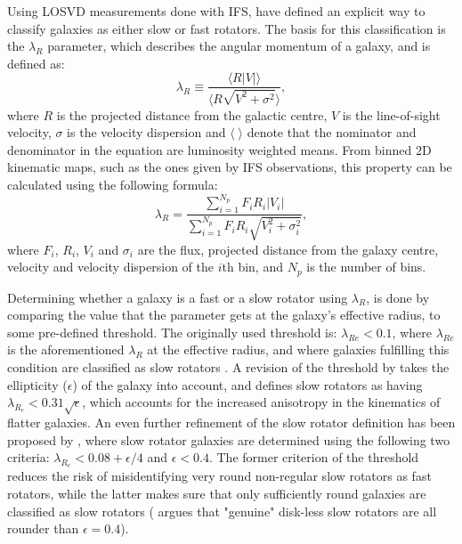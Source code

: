\documentclass[english, twoside]{HYgradu}
\begin{document}
Using LOSVD measurements done with IFS, \cite{Emsellem2007} have defined an explicit way to classify galaxies as either slow or fast rotators. The basis for this classification is the $\lambda_R$ parameter, which describes the angular momentum of a galaxy, and is defined as:  
\begin{equation}
\lambda_R \equiv \frac{\langle R |V| \rangle}{\langle R \sqrt{V^2 + \sigma^2} \rangle}, \label{eq:general_lambdar}
\end{equation}
where $R$ is the projected distance from the galactic centre, $V$ is the line-of-sight velocity, $\sigma$ is the velocity dispersion and $\langle \; \rangle$ denote that the nominator and denominator in the equation are luminosity weighted means. From binned 2D kinematic maps, such as the ones given by IFS observations, this property can be calculated using the following formula:
\begin{equation}
\lambda_R = \frac{\sum^{N_p}_{i=1} F_i R_i |V_i|}{\sum^{N_p}_{i=1} F_i R_i \sqrt{V_i^2 + \sigma^2_i}}, \label{eq:binned_lambdar}
\end{equation}
where $F_i$, $R_i$, $V_i$ and $\sigma_i$ are the flux, projected distance from the galaxy centre, velocity and velocity dispersion of the $i$th bin, and $N_p$ is the number of bins.

Determining whether a galaxy is a fast or a slow rotator using $\lambda_R$, is done by comparing the value that the parameter gets at the galaxy's effective radius, to some pre-defined threshold. The originally used threshold is: $\lambda_{Re} < 0.1$, where $\lambda_{Re}$ is the aforementioned $\lambda_R$ at the effective radius, and where galaxies fulfilling this condition are classified as slow rotators \citep{Emsellem2007}. A revision of the threshold by \cite{Emsellem2011} takes the ellipticity ($\epsilon$) of the galaxy into account, and defines slow rotators as having $\lambda_{R_e} < 0.31 \sqrt{\epsilon}$, which accounts for the increased anisotropy in the kinematics of flatter galaxies. An even further refinement of the slow rotator definition has been proposed by \cite{Cappellari2016}, where slow rotator galaxies are determined using the following two criteria: $\lambda_{R_e} < 0.08 + \epsilon/4$ and $\epsilon < 0.4$. The former criterion of the threshold reduces the risk of misidentifying very round non-regular slow rotators as fast rotators, while the latter makes sure that only sufficiently round galaxies are classified as slow rotators (\citealt{Cappellari2016} argues that "genuine" disk-less slow rotators are all rounder than $\epsilon = 0.4$).
\end{document}
